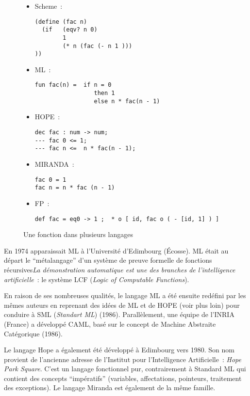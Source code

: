 \begin{figure*}[htb]
\barre
\begin{itemize}
\item Scheme~:
\begin{verbatim}
(define (fac n)
  (if   (eqv? n 0) 
        1 
        (* n (fac (- n 1 )))
))
\end{verbatim}
\item ML~:
\begin{verbatim}
fun fac(n) =  if n = 0 
                 then 1 
                 else n * fac(n - 1)
\end{verbatim}
\item HOPE~: 
\begin{verbatim}
dec fac : num -> num;
--- fac 0 <= 1;
--- fac n <=  n * fac(n - 1);
\end{verbatim}
\item MIRANDA~: 
\begin{verbatim}
fac 0 = 1
fac n = n * fac (n - 1)
\end{verbatim}
\item FP~:
\begin{verbatim}
def fac = eq0 -> 1 ;  * o [ id, fac o ( - [id, 1] ) ]
\end{verbatim}
\end{itemize}
\caption{Une fonction dans plusieurs langages}
\barre
\label{ExemplesDivers}
\end{figure*}

En 1974 apparaissait ML  à l'Université d'Edimbourg (Écosse).  ML
était au départ le ``métalangage'' d'un système de preuve formelle de
fonctions récursives\emph{La démonstration automatique est une des
branches de l'intelligence artificielle}~: le système LCF (\emph{Logic of Computable
Functions}).

En raison de ses nombreuses qualités, le langage ML a été ensuite
redéfini par les mêmes auteurs en reprenant des idées de ML et de HOPE
(voir plus loin) pour conduire à SML 
(\emph{Standart ML}) (1986). Parallèlement, une équipe de l'INRIA (France) a
développé CAML,  basé sur le concept
de Machine Abstraite Catégorique (1986).

Le langage Hope a également été développé à Edimbourg vers 1980. Son
nom provient de l'ancienne adresse de l'Institut pour l'Intelligence
Artificielle~: \emph{Hope Park Square}. C'est un langage fonctionnel pur,
contrairement à Standard ML qui contient des concepts ``impératifs''
(variables, affectations, pointeurs, traitement des exceptions). Le
langage Miranda est également de la même famille.


